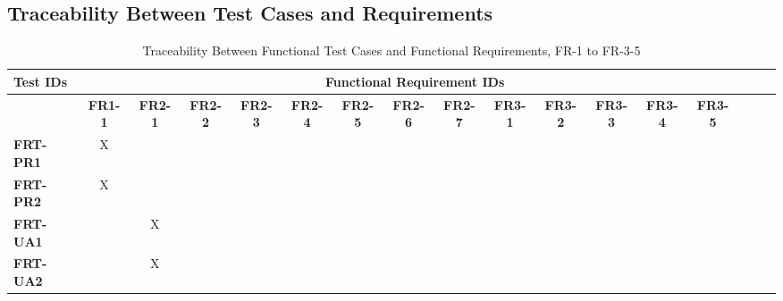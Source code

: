 \documentclass[12pt, titlepage]{article}
\begin{document}
\newpage
\begin{landscape}
\subsection{Traceability Between Test Cases and Requirements}
	\footnotesize
	\begin{longtable}{|l|cccccccccccccccc|}
	\caption{Traceability Between Functional Test Cases and Functional Requirements, FR-1 to FR-3-5}                                                                                                                                                                                                                           \\
		\hline
		\textbf{Test IDs}   & \multicolumn{14}{c|}{\textbf{Functional Requirement IDs}}                                                                                                                                                                                                                 \\
		\hline
		~                   & \textbf{FR1-1}  & \textbf{FR2-1} & \textbf{FR2-2} & \textbf{FR2-3} & \textbf{FR2-4} & \textbf{FR2-5} & \textbf{FR2-6} & \textbf{FR2-7} & \textbf{FR3-1} & \textbf{FR3-2} & \textbf{FR3-3} & \textbf{FR3-4} & \textbf{FR3-5} \\
		\hline
		\textbf{FRT-PR1} & X                                                         & ~             & ~             & ~             & ~             & ~             & ~             & ~             & ~             & ~             & ~             & ~             & ~             \\
		\textbf{FRT-PR2} & X                                                         & ~             & ~             & ~             & ~             & ~             & ~             & ~             & ~             & ~             & ~             & ~             & ~             \\
		\textbf{FRT-UA1} & ~                                                         & X             & ~             & ~             & ~             & ~             & ~             & ~             & ~             & ~             & ~             & ~             & ~             \\
		\textbf{FRT-UA2} & ~                                                         & X             & ~ & ~             & ~             & ~             & ~             & ~             & ~             & ~             & ~             & ~             & ~             \\

\end{longtable}
\end{landscape}
\end{document}
